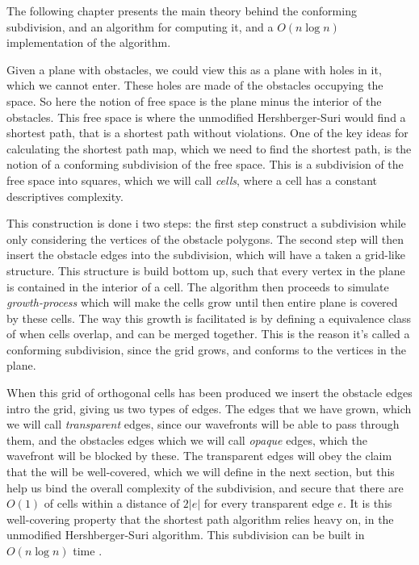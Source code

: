 \label{chapter:conformingsubdivision}

The following chapter presents the main theory behind the conforming subdivision, and an 
algorithm for computing it, and a $O(n \log n)$ implementation of the algorithm. 

Given a plane with obstacles, we could view this as a plane with holes in it, which we 
cannot enter. These holes are made of the obstacles occupying the space. So here the notion 
of free space is the plane minus the interior of the obstacles. This free space is where the 
unmodified Hershberger-Suri would find a shortest path, that is a shortest path without 
violations. One of the key ideas for calculating the shortest path map, which we need to 
find the shortest path, is the notion of a conforming subdivision of the free space. This is 
a subdivision of the free space into squares, which we will call \textit{cells}, where a 
cell has a constant descriptives complexity. 

This construction is done i two steps: the 
first step construct a subdivision while only considering the vertices of the obstacle 
polygons. The second step will then insert the obstacle edges into the subdivision, which 
will have a taken a grid-like structure. This structure is build bottom up, such that every 
vertex in the plane is contained in the interior of a cell. The algorithm then proceeds to 
simulate \textit{growth-process} which will make the cells grow until then entire plane is 
covered by these cells. The way this growth is facilitated is by defining a equivalence 
class of when cells overlap, and can be merged together. This is the reason it's called a 
conforming subdivision, since the grid grows, and conforms to the vertices in the plane. 


When this grid of orthogonal cells has been produced we insert the obstacle edges intro the 
grid, giving us two types of edges. The edges that we have grown, which we will call 
\textit{transparent} edges, since our wavefronts will be able to pass through them, and the 
obstacles edges which we will call \textit{opaque} edges, which the wavefront will be 
blocked by these. The transparent edges will obey the claim that the will be well-covered, 
which we will define in the next section, but this help us bind the overall complexity of 
the subdivision, and secure that there are $O(1)$ of cells within a distance of $2|e|$ for 
every transparent edge $e$. It is this well-covering property that the shortest path 
algorithm relies heavy on, in the unmodified Hershberger-Suri algorithm. This subdivision 
can be built in $O(n \log n)$ time \cite{HershbergerS99}.

